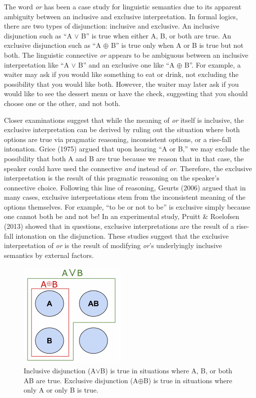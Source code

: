 \documentclass[10pt, letterpaper]{article}
\newenvironment{CodeChunk}{}{}
\begin{document}
The word \emph{or} has been a case study for linguistic semantics due to
its apparent ambiguity between an inclusive and exclusive
interpretation. In formal logics, there are two types of disjunction:
inclusive and exclusive. An inclusive disjunction such as ``A \(\vee\)
B'' is true when either A, B, or both are true. An exclusive disjunction
such as ``A \(\oplus\) B'' is true only when A or B is true but not
both. The linguistic connective \emph{or} appears to be ambiguous
between an inclusive interpretation like ``A \(\vee\) B'' and an
exclusive one like ``A \(\oplus\) B''. For example, a waiter may ask if
you would like something to eat or drink, not excluding the possibility
that you would like both. However, the waiter may later ask if you would
like to see the dessert menu or have the check, suggesting that you
should choose one or the other, and not both.

Closer examinations suggest that while the meaning of \emph{or} itself
is inclusive, the exclusive interpretation can be derived by ruling out
the situation where both options are true via pragmatic reasoning,
inconsistent options, or a rise-fall intonation. Grice (1975) argued
that upon hearing ``A or B,'' we may exclude the possibility that both A
and B are true because we reason that in that case, the speaker could
have used the connective \emph{and} instead of \emph{or}. Therefore, the
exclusive interpretation is the result of this pragmatic reasoning on
the speaker's connective choice. Following this line of reasoning,
Geurts (2006) argued that in many cases, exclusive interpretations stem
from the inconsistent meaning of the options themselves. For example,
``to be or not to be'' is exclusive simply because one cannot both be
and not be! In an experimental study, Pruitt \& Roelofsen (2013) showed
that in questions, exclusive interpretations are the result of a
rise-fall intonation on the disjunction. These studies suggest that the
exclusive interpretation of \emph{or} is the result of modifying
\emph{or}'s underlyingly inclusive semantics by external factors.

\begin{CodeChunk}
\begin{figure}[t]

{\centering \includegraphics{figs/aorb-1} 

}

\caption[Inclusive disjunction (A$\vee$B) is true in situations where A, B, or both AB are true]{Inclusive disjunction (A$\vee$B) is true in situations where A, B, or both AB are true. Exclusive disjunction (A$\oplus$B) is true in situations where only A or only B is true.}\label{fig:aorb}
\end{figure}
\end{CodeChunk}
\end{document}
